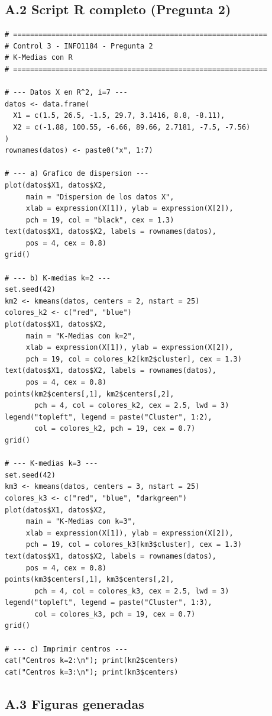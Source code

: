 \documentclass[10pt,a4paper]{article}
\begin{document}
\subsection*{A.2 Script R completo (Pregunta 2)}

\begin{lstlisting}
# ============================================================
# Control 3 - INFO1184 - Pregunta 2
# K-Medias con R
# ============================================================

# --- Datos X en R^2, i=7 ---
datos <- data.frame(
  X1 = c(1.5, 26.5, -1.5, 29.7, 3.1416, 8.8, -8.11),
  X2 = c(-1.88, 100.55, -6.66, 89.66, 2.7181, -7.5, -7.56)
)
rownames(datos) <- paste0("x", 1:7)

# --- a) Grafico de dispersion ---
plot(datos$X1, datos$X2,
     main = "Dispersion de los datos X",
     xlab = expression(X[1]), ylab = expression(X[2]),
     pch = 19, col = "black", cex = 1.3)
text(datos$X1, datos$X2, labels = rownames(datos),
     pos = 4, cex = 0.8)
grid()

# --- b) K-medias k=2 ---
set.seed(42)
km2 <- kmeans(datos, centers = 2, nstart = 25)
colores_k2 <- c("red", "blue")
plot(datos$X1, datos$X2,
     main = "K-Medias con k=2",
     xlab = expression(X[1]), ylab = expression(X[2]),
     pch = 19, col = colores_k2[km2$cluster], cex = 1.3)
text(datos$X1, datos$X2, labels = rownames(datos),
     pos = 4, cex = 0.8)
points(km2$centers[,1], km2$centers[,2],
       pch = 4, col = colores_k2, cex = 2.5, lwd = 3)
legend("topleft", legend = paste("Cluster", 1:2),
       col = colores_k2, pch = 19, cex = 0.7)
grid()

# --- K-medias k=3 ---
set.seed(42)
km3 <- kmeans(datos, centers = 3, nstart = 25)
colores_k3 <- c("red", "blue", "darkgreen")
plot(datos$X1, datos$X2,
     main = "K-Medias con k=3",
     xlab = expression(X[1]), ylab = expression(X[2]),
     pch = 19, col = colores_k3[km3$cluster], cex = 1.3)
text(datos$X1, datos$X2, labels = rownames(datos),
     pos = 4, cex = 0.8)
points(km3$centers[,1], km3$centers[,2],
       pch = 4, col = colores_k3, cex = 2.5, lwd = 3)
legend("topleft", legend = paste("Cluster", 1:3),
       col = colores_k3, pch = 19, cex = 0.7)
grid()

# --- c) Imprimir centros ---
cat("Centros k=2:\n"); print(km2$centers)
cat("Centros k=3:\n"); print(km3$centers)
\end{lstlisting}

\subsection*{A.3 Figuras generadas}
\end{document}
